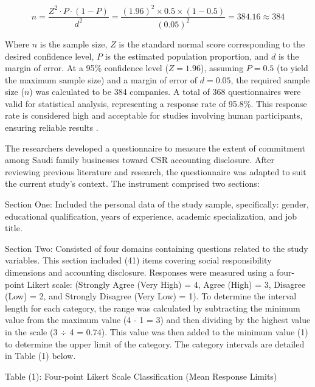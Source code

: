 \documentclass[10pt]{NSP1}
\begin{document}
\begin{equation}
	n = \frac{Z^{2} \cdot P \cdot (1 - P)}{d^{2}}
	= \frac{(1.96)^{2} \times 0.5 \times (1 - 0.5)}{(0.05)^{2}}
	= 384.16 \approx 384
\end{equation}

Where $n$ is the sample size, $Z$ is the standard normal score corresponding to the desired confidence level, $P$ is the estimated population proportion, and $d$ is the margin of error. At a 95\% confidence level ($Z = 1.96$), assuming $P = 0.5$ (to yield the maximum sample size) and a margin of error of $d = 0.05$, the required sample size ($n$) was calculated to be 384 companies. A total of 368 questionnaires were valid for statistical analysis, representing a response rate of 95.8\%. This response rate is considered high and acceptable for studies involving human participants, ensuring reliable results \citep{ref34}.
\par\vspace{6.0pt}\vspace{12.0pt}

The researchers developed a questionnaire to measure the extent of commitment among Saudi family businesses toward CSR accounting disclosure. After reviewing previous literature and research, the questionnaire was adapted to suit the current study's context. The instrument comprised two sections:

Section One: Included the personal data of the study sample, specifically: gender, educational qualification, years of experience, academic specialization, and job title.

Section Two: Consisted of four domains containing questions related to the study variables. This section included (41) items covering social responsibility dimensions and accounting disclosure. Responses were measured using a four-point Likert scale: (Strongly Agree (Very High) = 4, Agree (High) = 3, Disagree (Low) = 2, and Strongly Disagree (Very Low) = 1). To determine the interval length for each category, the range was calculated by subtracting the minimum value from the maximum value (4 - 1 = 3) and then dividing by the highest value in the scale (3 ÷ 4 = 0.74). This value was then added to the minimum value (1) to determine the upper limit of the category. The category intervals are detailed in Table (1) below.

Table (1): Four-point Likert Scale Classification (Mean Response Limits)
\end{document}
